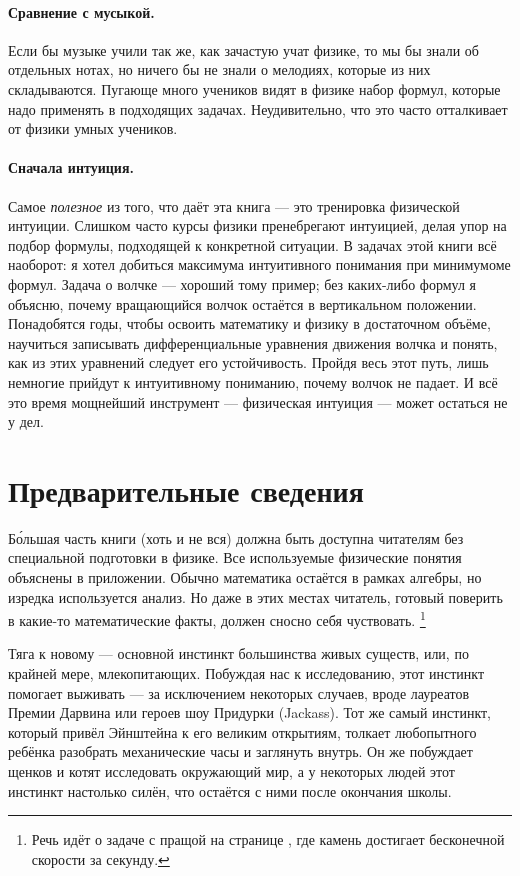 \paragraph*{Сравнение с мусыкой.}
Если бы музыке учили так же, как зачастую учат физике, то мы бы знали об отдельных нотах, но ничего бы не знали о мелодиях, которые из них складываются.
Пугающе много учеников видят в физике набор формул, которые надо применять в подходящих задачах.
Неудивительно, что это часто отталкивает от физики умных учеников.

\paragraph*{Сначала интуиция.}
Самое \emph{полезное} из того, что даёт эта книга --- это тренировка физической интуиции.
Слишком часто курсы физики пренебрегают интуицией, делая упор на подбор формулы, подходящей к конкретной ситуации.
В задачах этой книги всё наоборот:
я хотел добиться максимума интуитивного понимания при минимумоме формул.
Задача о волчке --- хороший тому пример;
без каких-либо формул я объясню, почему вращающийся волчок остаётся в вертикальном положении.
Понадобятся годы, чтобы освоить математику и физику в достаточном объёме, научиться записывать дифференциальные уравнения движения волчка и понять, как из этих уравнений следует его устойчивость.
Пройдя весь этот путь, лишь немногие прийдут к интуитивному пониманию, почему волчок не падает.
И всё это время мощнейший инструмент --- физическая интуиция --- может остаться не у дел.

\section{Предварительные сведения}

Б\'{о}льшая часть книги (хоть и не вся) должна быть доступна читателям без специальной подготовки в физике.
Все используемые физические понятия объяснены в приложении.
Обычно математика остаётся в рамках алгебры, но изредка используется анализ.
Но даже в этих местах читатель, готовый поверить в какие-то математические факты, должен сносно себя чуствовать.%
\footnote{Речь идёт о задаче с пращой на странице \pageref{???}, где камень достигает бесконечной скорости за секунду.}

Тяга к новому — основной инстинкт большинства живых существ, или, по крайней мере, млекопитающих.
Побуждая нас к исследованию, этот инстинкт помогает выживать — за исключением некоторых случаев, вроде лауреатов Премии Дарвина или героев шоу Придурки (Jackass).
Тот же самый инстинкт, который привёл Эйнштейна к его великим открытиям, толкает любопытного ребёнка разобрать механические часы и заглянуть внутрь.
Он же побуждает щенков и котят исследовать окружающий мир,
а у некоторых людей этот инстинкт настолько силён, что остаётся с ними после окончания школы.


